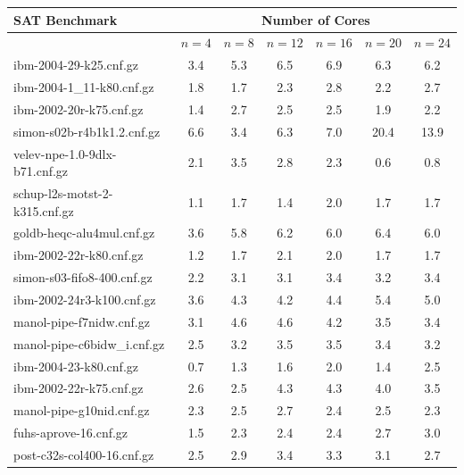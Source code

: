 \documentclass[letterpaper, compsoc, conference]{IEEEtran}
\begin{document}
\begin{table}[htbp]
    \begin{center}
    \begin{tabular}{|l|c|c|c|c|c|c|}
        \hline
        {\textbf{SAT Benchmark}} & \multicolumn{6}{c|}{\textbf{Number of Cores}} \\
        \hline
        & $n=4$ & $n=8$ & $n=12$ & $n=16$ & $n=20$ & $n=24$ \\
        \hline
      ibm-2004-29-k25.cnf.gz &                   3.4 &  5.3 &  6.5 &  6.9 &  6.3 &  6.2 \\
      ibm-2004-1\_11-k80.cnf.gz &                1.8 &  1.7 &  2.3 &  2.8 &  2.2 &  2.7 \\
      ibm-2002-20r-k75.cnf.gz &                  1.4 &  2.7 &  2.5 &  2.5 &  1.9 &  2.2 \\
      simon-s02b-r4b1k1.2.cnf.gz &               6.6 &  3.4 &  6.3 &  7.0 & 20.4 & 13.9 \\
      velev-npe-1.0-9dlx-b71.cnf.gz &            2.1 &  3.5 &  2.8 &  2.3 &  0.6 &  0.8 \\
      schup-l2s-motst-2-k315.cnf.gz &            1.1 &  1.7 &  1.4 &  2.0 &  1.7 &  1.7 \\
      goldb-heqc-alu4mul.cnf.gz &                3.6 &  5.8 &  6.2 &  6.0 &  6.4 &  6.0 \\
      ibm-2002-22r-k80.cnf.gz &                  1.2 &  1.7 &  2.1 &  2.0 &  1.7 &  1.7 \\
      simon-s03-fifo8-400.cnf.gz &               2.2 &  3.1 &  3.1 &  3.4 &  3.2 &  3.4 \\
      ibm-2002-24r3-k100.cnf.gz &                3.6 &  4.3 &  4.2 &  4.4 &  5.4 &  5.0 \\
      manol-pipe-f7nidw.cnf.gz &                 3.1 &  4.6 &  4.6 &  4.2 &  3.5 &  3.4 \\
      manol-pipe-c6bidw\_i.cnf.gz &              2.5 &  3.2 &  3.5 &  3.5 &  3.4 &  3.2 \\
      ibm-2004-23-k80.cnf.gz &                   0.7 &  1.3 &  1.6 &  2.0 &  1.4 &  2.5 \\
      ibm-2002-22r-k75.cnf.gz &                  2.6 &  2.5 &  4.3 &  4.3 &  4.0 &  3.5 \\
      manol-pipe-g10nid.cnf.gz &                 2.3 &  2.5 &  2.7 &  2.4 &  2.5 &  2.3 \\
      fuhs-aprove-16.cnf.gz &                    1.5 &  2.3 &  2.4 &  2.4 &  2.7 &  3.0 \\
      post-c32s-col400-16.cnf.gz   &             2.5 &  2.9 &  3.4 &  3.3 &  3.1 &  2.7 \\

\end{tabular}
\end{center}
\end{table}
\end{document}
